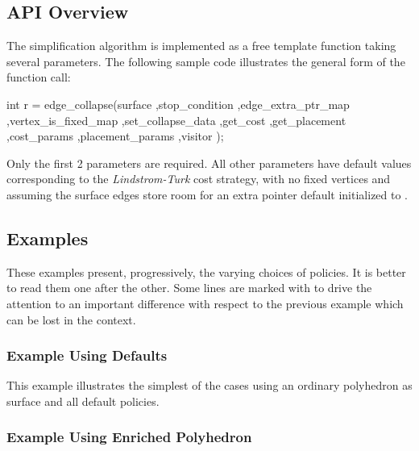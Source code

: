 \subsection{API Overview}

The simplification algorithm is implemented as a free template function taking several parameters. The following sample code illustrates the general form of the function call:

\begin{cprog}
int r = edge_collapse(surface
                     ,stop_condition
                     ,edge_extra_ptr_map
                     ,vertex_is_fixed_map
                     ,set_collapse_data
                     ,get_cost
                     ,get_placement
                     ,cost_params
                     ,placement_params
                     ,visitor 
                     );
\end{cprog}

Only the first 2 parameters are required. All other parameters have default values corresponding to the {\em Lindstrom-Turk} cost strategy, with no fixed vertices and assuming the surface edges store room for an extra pointer default initialized to .

\subsection{Examples}

These examples present, progressively, the varying choices of policies. It is better to read them one after the other.
Some lines are marked with  to drive the attention to an important difference with respect to the previous example which can be lost in the context.

\subsubsection{Example Using Defaults}

This example illustrates the simplest of the cases using an ordinary polyhedron as surface and all default policies.



\subsubsection{Example Using Enriched Polyhedron}

